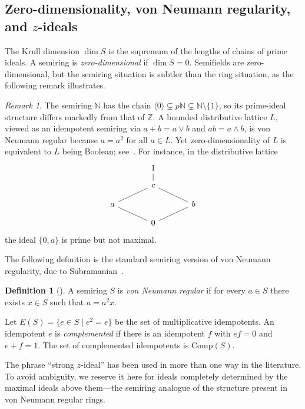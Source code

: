 \documentclass[11pt,leqno]{amsart}
\theoremstyle{plain}
\theoremstyle{definition}
\newtheorem{definition}{Definition}[section]
\theoremstyle{remark}
\newtheorem{remark}[theorem]{Remark}
\numberwithin{equation}{section}
\newcommand{\ideal}[1]{\langle #1\rangle}
\newcommand{\N}{\mathds N}
\begin{document}
\subsection{Zero-dimensionality, von Neumann regularity, and
\texorpdfstring{$z$}{z}-ideals}

The Krull dimension $\dim S$ is the supremum of the lengths of chains
of prime ideals.  A semiring is \emph{zero-dimensional} if $\dim S=0$.
Semifields are zero-dimensional, but the semiring situation is subtler
than the ring situation, as the following remark illustrates.

\begin{remark}
The semiring $\N$ has the chain
$\ideal{0}\subsetneq p\N\subsetneq\N\setminus\{1\}$,
so its prime-ideal structure differs markedly from that of $\mathds{Z}$.
A bounded distributive lattice $L$, viewed as an idempotent semiring
via $a+b=a\vee b$ and $ab=a\wedge b$, is von Neumann regular because
$a=a^2$ for all $a\in L$.
Yet zero-dimensionality of $L$ is equivalent to $L$ being Boolean;
see~\cite{Nachbin47}.
For instance, in the distributive lattice
\[
\begin{tikzcd}[row sep=small,column sep=large]
&1\arrow[d,dash]&\\
&c\arrow[dl,dash]\arrow[dr,dash]&\\
a\arrow[dr,dash]&&b\arrow[dl,dash]\\
&0&
\end{tikzcd}
\]
the ideal $\{0,a\}$ is prime but not maximal.
\end{remark}

The following definition is the standard semiring version of von
Neumann regularity, due to Subramanian~\cite{Subramanian70/RegularSemirings}.

\begin{definition}[\cite{Golan/Book,Subramanian70/RegularSemirings}]
A semiring $S$ is \emph{von Neumann regular} if for every $a\in S$
there exists $x\in S$ such that $a=a^2x$.
\end{definition}

Let $E(S)=\{e\in S\mid e^2=e\}$ be the set of multiplicative
idempotents.  An idempotent $e$ is \emph{complemented} if there is
an idempotent $f$ with $ef=0$ and $e+f=1$.
The set of complemented idempotents is $\mathrm{Comp}(S)$.

The phrase ``strong $z$-ideal'' has been used in more than one way
in the literature.  To avoid ambiguity, we reserve it here for ideals
completely determined by the maximal ideals above them---the semiring
analogue of the structure present in von Neumann regular rings.
\end{document}
